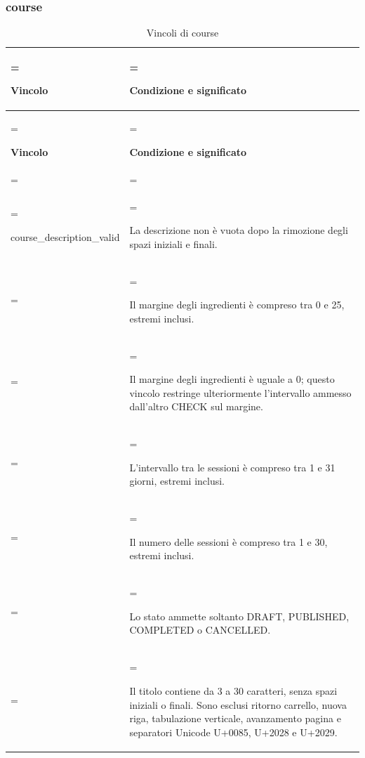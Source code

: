 \documentclass[11pt,a4paper]{article}
\begin{document}
\subsubsection{course}
{\small\renewcommand{\arraystretch}{1.25}
\begin{xltabular}{\linewidth}{>{\hsize\linewidth=\hsize\raggedright\arraybackslash}X>{\hsize\linewidth=\hsize\raggedright\arraybackslash}X}
\caption{Vincoli di course}\label{tab:dictionary-33}\\
\toprule
\textbf{Vincolo} & \textbf{Condizione e significato}\\\midrule\endfirsthead\toprule\textbf{Vincolo} & \textbf{Condizione e significato}\\\midrule\endhead
\midrule{}\\\endfoot\bottomrule\endlastfoot

{\ttfamily\small course\_\allowbreak{}description\_\allowbreak{}valid} & La descrizione non è vuota dopo la rimozione degli spazi iniziali e finali.\\ & Il margine degli ingredienti è compreso tra 0 e 25, estremi inclusi.\\ & Il margine degli ingredienti è uguale a 0; questo vincolo restringe ulteriormente l'intervallo ammesso dall'altro CHECK sul margine.\\ & L'intervallo tra le sessioni è compreso tra 1 e 31 giorni, estremi inclusi.\\ & Il numero delle sessioni è compreso tra 1 e 30, estremi inclusi.\\ & Lo stato ammette soltanto DRAFT, PUBLISHED, COMPLETED o CANCELLED.\\ & Il titolo contiene da 3 a 30 caratteri, senza spazi iniziali o finali. Sono esclusi ritorno carrello, nuova riga, tabulazione verticale, avanzamento pagina e separatori Unicode U+0085, U+2028 e U+2029.\\*
\end{xltabular}}
\end{document}
